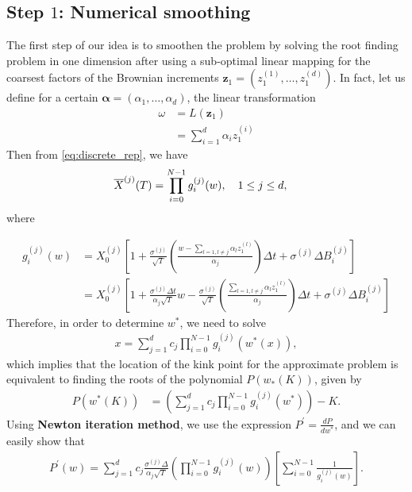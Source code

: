 \subsection{Step $1$: Numerical smoothing}
The first step of our idea is to smoothen the problem by solving the root finding problem in one dimension after using a sub-optimal linear mapping for the coarsest factors of the Brownian increments $\mathbf{z}_1=(z^{(1)}_1 , \dots, z^{(d)}_1)$. In fact, let us define for a certain $\boldsymbol{\alpha}=(\alpha_1,\dots,\alpha_d)$, the linear transformation
\begin{align}\label{eq:linear_transformation}
\omega&=L(\mathbf{z}_1) \nonumber\\
&= \sum_{i=1}^{d} \alpha_i z^{(i)}_1
\end{align}
Then from \eqref{eq:discrete_rep}, we have
 \begin{align}\label{eq:discrete_rep_2}
	\overline{X}^{(j)}(T)&= \prod_{i=0}^{N-1} g_i^{(j)}(w) , \quad 1 \le j \le d,
\end{align}
where 

\begin{align}\label{eq: incremental functions}
g_i^{(j)}(w)&=X_0^{(j)}  \left[ 1+\frac{\sigma^{(j)}}{\sqrt{T}} \left( \frac{w- \sum_{l=1, l\neq j} \alpha_l z^{(l)}_1}{\alpha_j} \right) \Delta t+ \sigma^{(j)} \Delta B^{(j)}_{i}\right] \nonumber\\
&=X_0^{(j)}  \left[ 1+\frac{\sigma^{(j)} \Delta t}{ \alpha_j \sqrt{T}} w -\frac{\sigma^{(j)}}{\sqrt{T}} \left( \frac{\sum_{l=1, l\neq j} \alpha_l z^{(l)}_1}{\alpha_j} \right) \Delta t+ \sigma^{(j)} \Delta B^{(j)}_{i}\right]
\end{align}
Therefore, in order to determine $w^{\ast}$, we need to solve
\begin{align}
	x=\sum_{j=1}^{d} c_j \prod_{i=0}^{N-1} g_i^{(j)}(w^{\ast}(x)),
\end{align}
which implies that the location of the kink point for the approximate problem is equivalent to finding the roots of the polynomial $P(w_\ast(K))$, given by
\begin{align}\label{polynomial_kink_location_basket}
	P(w^\ast(K))&=\left(\sum_{j=1}^{d} c_j \prod_{i=0}^{N-1}  g_i^{(j)}(w^{\ast}) \right) -K.
\end{align}
Using  \textbf{Newton iteration method}, we use the expression $P^\prime=\frac{d P}{d w^\ast}$, and we can easily show that
\begin{align}\label{polynomial_kink_location_derivative_basket}
	P^\prime(w)=\sum_{j=1}^{d} c_j \frac{\sigma^{(j)} \Delta} {\alpha_j\sqrt{T}} \left( \prod_{i=0}^{N-1} g_i^{(j)}(w) \right) \left[ \sum_{i=0}^{N-1} \frac{1}{g_i^{(j)}(w)}\right].
\end{align}



